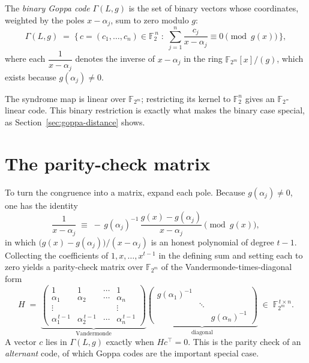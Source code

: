 \begin{definition}
The \emph{binary Goppa code} $\Gamma(L,g)$ is the set of binary vectors whose coordinates, weighted by the poles $x-\alpha_j$, sum to zero modulo $g$:
\[
\Gamma(L,g) \;=\; \Big\{\, c=(c_1,\dots,c_n)\in\mathbb{F}_2^{\,n} \;:\; \sum_{j=1}^{n} \frac{c_j}{x-\alpha_j} \equiv 0 \pmod{g(x)} \,\Big\},
\]
where each $\dfrac{1}{x-\alpha_j}$ denotes the inverse of $x-\alpha_j$ in the ring $\mathbb{F}_{2^m}[x]/(g)$, which exists because $g(\alpha_j)\neq 0$.
\end{definition}

The syndrome map is linear over $\mathbb{F}_{2^m}$; restricting its kernel to
$\mathbb{F}_2^n$ gives an $\mathbb{F}_2$-linear code. This binary restriction is
exactly what makes the binary case special, as Section~\ref{sec:goppa-distance} shows.

\section{The parity-check matrix}

To turn the congruence into a matrix, expand each pole. Because $g(\alpha_j)\neq 0$, one has the identity
\[
\frac{1}{x-\alpha_j} \;\equiv\; -\,g(\alpha_j)^{-1}\,\frac{g(x)-g(\alpha_j)}{x-\alpha_j} \pmod{g(x)},
\]
in which $\big(g(x)-g(\alpha_j)\big)/(x-\alpha_j)$ is an honest polynomial of degree $t-1$. Collecting the coefficients of $1,x,\dots,x^{t-1}$ in the defining sum and setting each to zero yields a parity-check matrix over $\mathbb{F}_{2^m}$ of the Vandermonde-times-diagonal form
\[
H \;=\;
\underbrace{\begin{pmatrix}
1 & 1 & \cdots & 1\\
\alpha_1 & \alpha_2 & \cdots & \alpha_n\\
\vdots & & & \vdots\\
\alpha_1^{\,t-1} & \alpha_2^{\,t-1} & \cdots & \alpha_n^{\,t-1}
\end{pmatrix}}_{\text{Vandermonde}}
\underbrace{\begin{pmatrix}
g(\alpha_1)^{-1} & & \\
 & \ddots & \\
 & & g(\alpha_n)^{-1}
\end{pmatrix}}_{\text{diagonal}}
\;\in\; \mathbb{F}_{2^m}^{\,t\times n}.
\]
A vector $c$ lies in $\Gamma(L,g)$ exactly when $H c^{\top}=0$. This is the parity check of an \emph{alternant} code, of which Goppa codes are the important special case.

